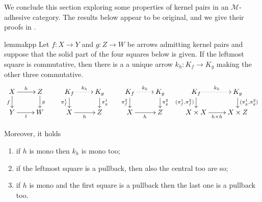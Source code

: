 \documentclass[a4paper,UKenglish,cleveref,pdftex,thm-restate,numberwithinsect]{lipics-v2021}
\def\D{\textbf {\textup{D}}}
\def\X{\textbf {\textup{X}}}
\newcommand{\commentato}[1]{ {} }
\begin{document}
\commentato{ 
\begin{restatable}{corollary}{natepi}\label{cor:reg_epi_components_reg_epi_nat_trans}
    Let $\X$ be a category with pullbacks and $\phi\colon F \to G$ a natural transformation between functors $F, G: \D \rightrightarrows \X$. If $\phi_d$ is a regular epi for every $d$, then $\phi$ is a regular epi.
\end{restatable}

From the previous result we deduce that the class of regular epis is closed under colimits.

\begin{restatable}{lemma}{epicol}\label{lemma:nat_trans_reg_epi_canonical_arrow_reg_epi}
    Let $F,G\colon \D\rightrightarrows \X$ be two diagrams, and suppose that $\X$ has all colimits of shape $\D$. Let $(X, \{x_d\}_{d \in \D})$ and $(Y, \{y_d\}_{d\in D})$ be the colimits of $F$ and $G$, respectively.  If $\phi\colon  F \to G$ is a natural transformation whose components are regular epis, then the arrow induced by $\phi$ from $X$ to $Y$ is a regular epi.
\end{restatable}
}
We conclude this section exploring some properties of kernel pairs in an $\mathcal{M}$-adhesive category. 
The results below appear to be original, and we give their proofs in .

\begin{restatable}{lemma}{kpp}\label{lemma:kern_pairs_pres_pullbacks}
	Let $f\colon X \to Y$ and $g\colon Z \to W$ be arrows admitting kernel pairs and suppose that the solid part of the four squares below is given. 
	If the leftmost square is commutative, then there is a a unique arrow $k_h\colon K_f \to K_g$ making the other three commutative.
	\[\xymatrix@R=15pt{X \ar[r]^{h}\ar[d]_{f}& Z \ar[d]^{g} & K_f \ar@{.>}[r]^{k_h} \ar[d]_{\pi^1_f}& K_g \ar[d]^{\pi^1_g} & K_f  \ar@{.>}[r]^{k_h} \ar[d]_{\pi^2_f}& K_g \ar[d]^{\pi^2_g}& K_f  \ar@{.>}[r]^{k_h} \ar[d]_{(\pi^1_f,\pi^2_f)} & K_g \ar[d]^{(\pi^1_g, \pi^2_g)}\\ Y \ar[r]_t& W & X \ar[r]_{h} & Z & X\ar[r]_{h} &Z & X\times X \ar[r]_{h\times h}& X\times Z}\]
	
		Moreover, it holds
		\begin{enumerate}
			\item if $h$ is mono then $k_h$ is mono too;
			\item if the leftmost square is a pullback, then also the central too are so;
			\item if $h$ is mono and the first square is a pullback then the last one is a pullback too.
		\end{enumerate} 
\end{restatable}
\end{document}

